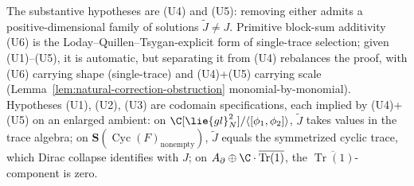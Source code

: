 \documentclass[11pt]{memoir}
\begin{document}
\begin{thm}\label{thm:Jf-uniqueness-rigidity}
  The substantive hypotheses are (U4) and (U5): removing either
  admits a positive-dimensional family of solutions \(\widetilde J
  \ne J\).  Primitive block-sum additivity (U6) is the
  Loday--Quillen--Tsygan-explicit form of single-trace selection;
  given (U1)--(U5), it is automatic, but separating it from (U4)
  rebalances the proof, with (U6) carrying shape (single-trace) and
  (U4)+(U5) carrying scale (Lemma~\ref{lem:natural-correction-obstruction}
  monomial-by-monomial).  Hypotheses (U1), (U2), (U3) are codomain
  specifications, each implied by (U4)+(U5) on an enlarged ambient:
  on \(\C[\lie{gl}_N^2]/\langle[\phi_1,\phi_2]\rangle\),
  \(\widetilde J\) takes values in the trace algebra; on
  \(\mathbf S(\operatorname{Cyc}(F)_{\mathrm{nonempty}})\),
  \(\widetilde J\) equals the symmetrized cyclic trace, which Dirac
  collapse identifies with \(J\); on
  \(A_\partial\oplus\C\cdot\overline{\operatorname{Tr}(1)}\),
  the \(\overline{\operatorname{Tr}(1)}\)-component is zero.
\end{thm}
\end{document}

